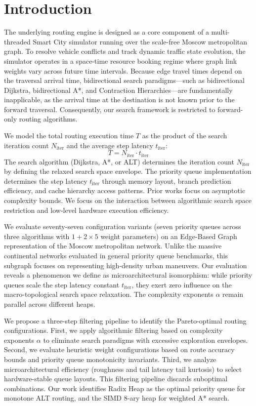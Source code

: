 \section{Introduction}
\label{sec:intro}

The underlying routing engine is designed as a core component of a multi-threaded Smart City simulator running over the scale-free Moscow metropolitan graph. To resolve vehicle conflicts and track dynamic traffic state evolution, the simulator operates in a space-time resource booking regime where graph link weights vary across future time intervals. Because edge travel times depend on the traversal arrival time, bidirectional search paradigms---such as bidirectional Dijkstra, bidirectional A*, and Contraction Hierarchies---are fundamentally inapplicable, as the arrival time at the destination is not known prior to the forward traversal. Consequently, our search framework is restricted to forward-only routing algorithms.
 

We model the total routing execution time $T$ as the product of the search iteration count $N_{\text{iter}}$ and the average step latency $t_{\text{iter}}$:
\begin{equation}
T = N_{\text{iter}} \cdot t_{\text{iter}}
\label{eq:latency_model}
\end{equation}
The search algorithm (Dijkstra, A*, or ALT) determines the iteration count $N_{\text{iter}}$ by defining the relaxed search space envelope. 
The priority queue implementation determines the step latency $t_{\text{iter}}$ through memory layout, branch prediction efficiency, and cache hierarchy access patterns. 
Prior works focus on asymptotic complexity bounds. 
We focus on the interaction between algorithmic search space restriction and low-level hardware execution efficiency.

We evaluate seventy-seven configuration variants (seven priority queues across three algorithms with $1 + 2 \times 5$ weight parameters) on an Edge-Based Graph representation of the Moscow metropolitan network. 
Unlike the massive continental networks evaluated in general priority queue benchmarks, this subgraph focuses on representing high-density urban maneuvers. 
Our evaluation reveals a phenomenon we define as microarchitectural isomorphism: while priority queues scale the step latency constant $t_{\text{iter}}$, they exert zero influence on the macro-topological search space relaxation. 
The complexity exponents $\alpha$ remain parallel across different heaps.

We propose a three-step filtering pipeline to identify the Pareto-optimal routing configurations. 
First, we apply algorithmic filtering based on complexity exponents $\alpha$ to eliminate search paradigms with excessive exploration envelopes. 
Second, we evaluate heuristic weight configurations based on route accuracy bounds and priority queue monotonicity invariants. 
Third, we analyze microarchitectural efficiency (roughness and tail latency tail kurtosis) to select hardware-stable queue layouts. 
This filtering pipeline discards suboptimal combinations. 
Our work identifies Radix Heap as the optimal priority queue for monotone ALT routing, and the SIMD 8-ary heap for weighted A* search.

